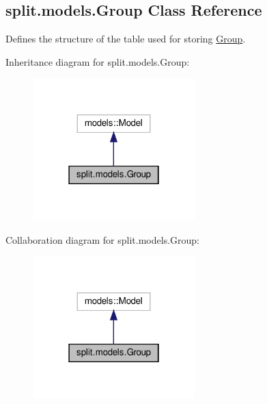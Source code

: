 \hypertarget{classsplit_1_1models_1_1Group}{}\subsection{split.\+models.\+Group Class Reference}
\label{classsplit_1_1models_1_1Group}


Defines the structure of the table used for storing \hyperlink{classsplit_1_1models_1_1Group}{Group}.  




Inheritance diagram for split.\+models.\+Group\+:\nopagebreak
\begin{figure}[H]
\begin{center}
\leavevmode
\includegraphics[width=178pt]{classsplit_1_1models_1_1Group__inherit__graph}
\end{center}
\end{figure}


Collaboration diagram for split.\+models.\+Group\+:\nopagebreak
\begin{figure}[H]
\begin{center}
\leavevmode
\includegraphics[width=178pt]{classsplit_1_1models_1_1Group__coll__graph}
\end{center}
\end{figure}
